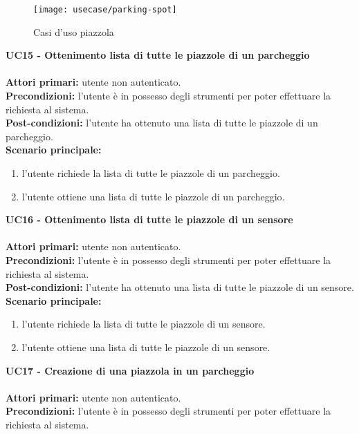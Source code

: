 \leavevmode\newline
\begin{figure}[H]
    \centering
    \texttt{[image: usecase/parking-spot]}
    \caption{Casi d'uso piazzola}
\end{figure}
\textbf{UC15 - Ottenimento lista di tutte le piazzole di un parcheggio}
\\\\
\textbf{Attori primari:} utente non autenticato.
\\
\textbf{Precondizioni:} l'utente è in possesso degli strumenti per poter effettuare la richiesta al sistema.
\\
\textbf{Post-condizioni:} l'utente ha ottenuto una lista di tutte le piazzole di un parcheggio.
\\
\textbf{Scenario principale:}
\begin{enumerate}
    \item l'utente richiede la lista di tutte le piazzole di un parcheggio.
    \item l'utente ottiene una lista di tutte le piazzole di un parcheggio.
\end{enumerate}
\leavevmode\newline
\textbf{UC16 - Ottenimento lista di tutte le piazzole di un sensore}
\\\\
\textbf{Attori primari:} utente non autenticato.
\\
\textbf{Precondizioni:} l'utente è in possesso degli strumenti per poter effettuare la richiesta al sistema.
\\
\textbf{Post-condizioni:} l'utente ha ottenuto una lista di tutte le piazzole di un sensore.
\\
\textbf{Scenario principale:}
\begin{enumerate}
    \item l'utente richiede la lista di tutte le piazzole di un sensore.
    \item l'utente ottiene una lista di tutte le piazzole di un sensore.
\end{enumerate}
\leavevmode\newline
\textbf{UC17 - Creazione di una piazzola in un parcheggio}
\\\\
\textbf{Attori primari:} utente non autenticato.
\\
\textbf{Precondizioni:} l'utente è in possesso degli strumenti per poter effettuare la richiesta al sistema.
\\
